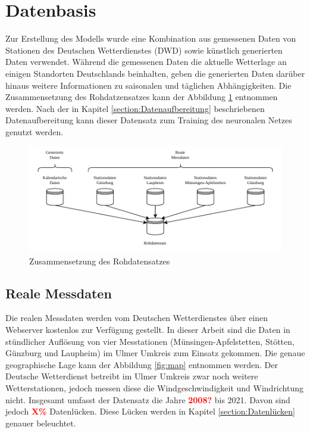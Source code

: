 \documentclass[
12pt, %
toc=listofnumbered, %
toc=chapterentrydotfill, %
numbers=noenddot, %
captions=tableheading, %
bibliography=numbered
]{scrreprt}
\let\Oldsection\section
\renewcommand{\section}{\FloatBarrier\Oldsection}
\let\Oldsubsection\subsection
\renewcommand{\subsection}{\FloatBarrier\Oldsubsection}
\newcommand{\highlight}[1]{\textbf{\textcolor{red}{#1}}}
\begin{document}
\section{Datenbasis}
Zur Erstellung des Modells wurde eine Kombination aus gemessenen Daten von Stationen des Deutschen Wetterdienstes (DWD) sowie künstlich generierten Daten verwendet.
Während die gemessenen Daten die aktuelle Wetterlage an einigen Standorten Deutschlands beinhalten, geben die generierten Daten darüber hinaus weitere Informationen zu saisonalen und täglichen Abhängigkeiten. Die Zusammensetzung des Rohdatzensatzes kann der Abbildung \ref{fig:rohdatensatz} entnommen werden. Nach der in Kapitel \ref{section:Datenaufbereitung} beschriebenen Datenaufbereitung kann dieser Datensatz zum Training des neuronalen Netzes genutzt werden.

\begin{figure}[tph]
	\begin{center}
		\includegraphics[]{./images/rohdatensatz.pdf}
		\caption{Zusammensetzung des Rohdatensatzes}
		\label{fig:rohdatensatz}
	\end{center}
\end{figure}

\subsection{Reale Messdaten}
Die realen Messdaten werden vom Deutschen Wetterdienstes über einen Webserver kostenlos zur Verfügung gestellt. In dieser Arbeit sind die Daten in stündlicher Auflösung von vier Messtationen (Münsingen-Apfelstetten, Stötten, Günzburg und Laupheim) im Ulmer Umkreis zum Einsatz gekommen. Die genaue geographische Lage kann der Abbildung \ref{fig:map} entnommen werden. Der Deutsche Wetterdienst betreibt im Ulmer Umkreis zwar noch weitere Wetterstationen, jedoch messen diese die Windgeschwindigkeit und Windrichtung nicht. Insgesamt umfasst der Datensatz die Jahre \highlight{2008?} bis 2021. Davon sind jedoch \highlight{X\%} Datenlücken. Diese Lücken werden in Kapitel \ref{section:Datenlücken} genauer beleuchtet. 
\end{document}
